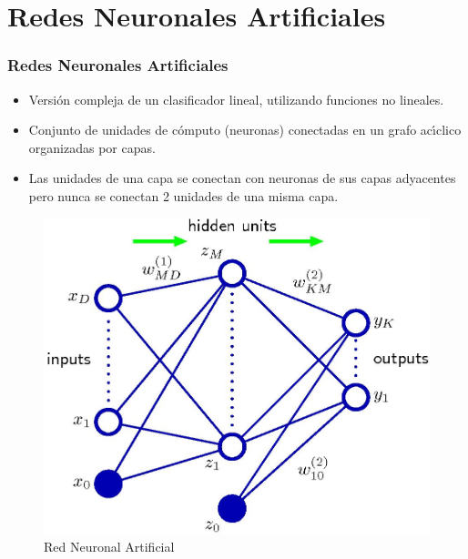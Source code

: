 \documentclass[12pt,center]{beamer}
\begin{document}
\section{Redes Neuronales Artificiales}
\begin{frame}
  \frametitle{Redes Neuronales Artificiales}
    \begin{itemize}
      \item Versión compleja de un clasificador lineal, utilizando funciones no lineales.
      \item Conjunto de unidades de cómputo (neuronas) conectadas en un grafo acı́clico organizadas por capas. 
      \item Las unidades de una capa se conectan con neuronas de sus capas adyacentes pero nunca se conectan 2 unidades de una misma capa.
    
    \end{itemize}

    
    \begin{figure}[ht]
      \begin{center}
	\includegraphics[width=0.8\linewidth]{./img/bishop_neural_network.jpg}
      \end{center}
      \caption{Red Neuronal Artificial}
    \end{figure}
\end{frame}
\end{document}
